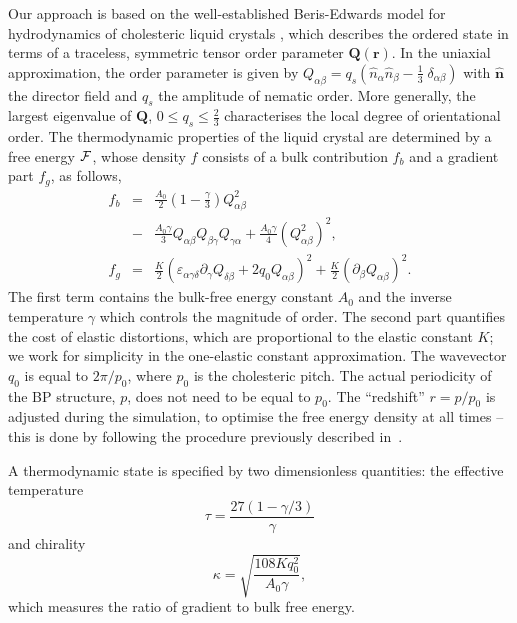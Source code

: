 \documentclass[aps,pre,reprint,superscriptaddress, twocolumn]{revtex4}
\begin{document}
Our approach is based on the well-established Beris-Edwards model for hydrodynamics of
cholesteric liquid crystals \cite{Beris:1994}, which describes the ordered state 
in terms of a traceless, symmetric tensor order parameter ${\mathbf Q}({\mathbf r})$. 
In the uniaxial approximation, the order parameter is given by
$Q_{\alpha \beta}= q_s ( \hat{n}_\alpha \hat{n}_\beta - \frac{1}{3}\; \delta_{\alpha\beta})$
with $\hat{{\mathbf n}}$ the director field and $q_s$ the amplitude of nematic
order. More generally,
the largest eigenvalue of ${\mathbf Q}$, $0\le q_s\le\frac{2}{3}$
characterises the local degree of orientational order.
The thermodynamic properties of the liquid crystal are determined by a free energy
${\cal F}$, whose density $f$ consists of a bulk contribution $f_b$ and a gradient part $f_g$, as follows,
\begin{eqnarray}
f_b&=&\frac{A_0}{2}\left(1-\frac{\gamma}{3}\right) Q_{\alpha \beta}^2\nonumber\\
&-&\frac{A_0 \gamma}{3}Q_{\alpha \beta} Q_{\beta \gamma} Q_{\gamma \alpha}+\frac{A_0 \gamma}{4}(Q_{\alpha \beta}^2)^2,\nonumber\\
f_g&=&\frac{K}{2}(\varepsilon_{\alpha\gamma\delta} \partial_\gamma Q_{\delta\beta}+2 q_0 Q_{\alpha \beta})^2+\frac{K}{2}(\partial_\beta Q_{\alpha \beta})^2.\label{FE}
\end{eqnarray}
The first term contains the bulk-free energy constant $A_0$ and the inverse temperature $\gamma$ which controls the magnitude of order.
The second part quantifies the cost of elastic distortions, which are proportional to the elastic constant $K$;
we work for simplicity in the one-elastic constant approximation. The wavevector $q_0$ is equal to $2\pi/p_0$, where $p_0$ is the cholesteric pitch.
The actual periodicity of the BP structure, $p$, does not need to be equal to $p_0$.
The ``redshift'' $r=p/p_0$ is adjusted during the simulation, to optimise the free energy density
at all times -- this is done by following the procedure
previously described in~\cite{Alexander:2006}.

A thermodynamic state is specified by two dimensionless quantities: the effective temperature 
\begin{equation}
\tau=\frac{27(1-\gamma/3)}{\gamma}
\end{equation}
and chirality 
\begin{equation}
\kappa=\sqrt{\frac{108 K q_0^2}{A_0 \gamma}},
\end{equation}
which measures the ratio of gradient to bulk free energy.
\end{document}
